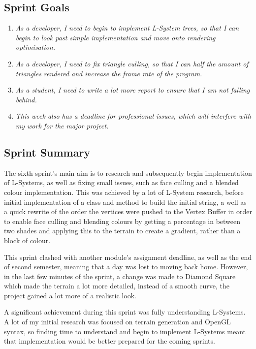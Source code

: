 \documentclass[a4paper,10pt]{report}
\begin{document}
\subsection{Sprint Goals}

\begin{enumerate}
    \item \textit{As a developer, I need to begin to implement L-System trees, so that I can begin to look past simple implementation and move onto rendering optimisation.  }
    \item \textit{As a developer, I need to fix triangle culling, so that I can half the amount of triangles rendered and increase the frame rate of the program.}
    \item \textit{As a student, I need to write a lot more report to ensure that I am not falling behind. }
    \item \textit{This week also has a deadline for professional issues, which will interfere with my work for the major project.}
    
\end{enumerate}
\subsection{Sprint Summary}

The sixth sprint's main aim is to research and subsequently begin implementation of L-Systems, as well as fixing small issues, such as face culling and a blended colour implementation. This was achieved by a lot of L-System research, before initial implementation of a class and method to build the initial string, a well as a quick rewrite of the order the vertices were pushed to the Vertex Buffer in order to enable face culling and blending colours by getting a percentage in between two shades and applying this to the terrain to create a gradient, rather than a block of colour. \medskip

This sprint clashed with another module's assignment deadline, as well as the end of second semester, meaning that a day was lost to moving back home. However, in the last few minutes of the sprint, a change was made to Diamond Square which made the terrain a lot more detailed, instead of a smooth curve, the project gained a lot more of a realistic look. \medskip

A significant achievement during this sprint was fully understanding L-Systems. A lot of my initial research was focused on terrain generation and OpenGL syntax, so finding time to understand and begin to implement L-Systems meant that implementation would be better prepared for the coming sprints. \clearpage
\end{document}
